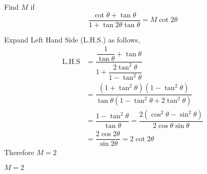 

\question[3] Find $M$ if
  \[\dfrac{\cot\theta+\tan\theta}{1+\tan2\theta\tan\theta} 
    = M\cot2\theta \nonumber\]

\begin{solution}[\halfpage]
  Expand Left Hand Side (L.H.S.) as follows,
  \begin{align}
    \text{L.H.S}
      &= \dfrac{\dfrac{1}{\tan\theta}+\tan\theta}
    		         {1+\dfrac{2\tan^2\theta}{1-\tan^2\theta}} \\
      &= \dfrac{(1+\tan^2\theta)(1-\tan^2\theta)}
    		         {\tan\theta(1-\tan^2\theta+2\tan^2\theta)} \\
    		&= \dfrac{1-\tan^2\theta}{\tan\theta}
    		 = \dfrac{2(\cos^2\theta-\sin^2\theta)}
    		         {2\cos\theta\sin\theta} \\
    		&= \dfrac{2\cos 2\theta}{\sin 2\theta}
    		 = 2\cot2\theta
  \end{align}
  Therefore $M=2$
\end{solution}
\ifprintanswers\begin{codex}$M=2$\end{codex}\fi
